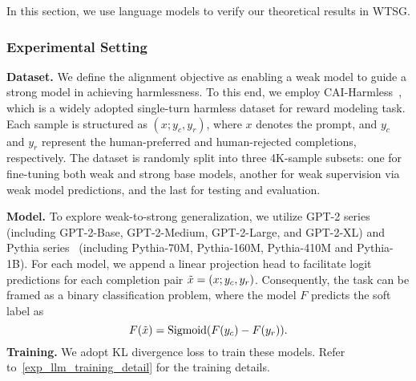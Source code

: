 In this section, we use language models to verify our theoretical results in WTSG.

\subsubsection{Experimental Setting}

\noindent \textbf{Dataset.}
We define the alignment objective as enabling a weak model to guide a strong model in achieving harmlessness. To this end, we employ CAI-Harmless~\citep{bai2022constitutional}, which is a widely adopted single-turn harmless dataset for reward modeling task. 
Each sample is structured as $(x;y_c,y_r)$, where $x$ denotes the prompt, and $y_c$ and $y_r$ represent the human-preferred and human-rejected completions, respectively.
The dataset is randomly split into three 4K-sample subsets: one for fine-tuning both weak and strong base models, another for weak supervision via weak model predictions, and the last for testing and evaluation.












\noindent \textbf{Model.}
To explore weak-to-strong generalization, we utilize GPT-2 series ~\citep{radford2019language} (including GPT-2-Base, GPT-2-Medium, GPT-2-Large, and GPT-2-XL) and Pythia series~\citep{biderman2023pythia} (including Pythia-70M, Pythia-160M, Pythia-410M and Pythia-1B).
For each model, we append a linear projection head to facilitate logit predictions for each completion pair $\Tilde{x}=(x;y_c,y_r)$. 
Consequently, the task can be framed as a binary classification problem, where the model $F$ predicts the soft label as 
$$F(\Tilde{x}) = \text{Sigmoid}(F(y_c)-F(y_r)).$$
\noindent \textbf{Training.}
We adopt KL divergence loss to train these models. Refer to~\cref{exp_llm_training_detail} for the training details.



